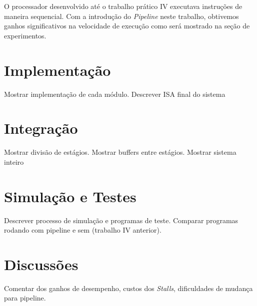 \documentclass[11pt,a4paper,titlepage]{article}
\begin{document}
O processador desenvolvido até o trabalho prático IV executava instruções de maneira
sequencial. Com a introdução do \textit{Pipeline} neste trabalho, obtivemos ganhos
significativos na velocidade de execução como será mostrado na seção de experimentos.

\section{Implementação}

Mostrar implementação de cada módulo. Descrever ISA final do sistema


\section{Integração}

Mostrar divisão de estágios. Mostrar buffers entre estágios. Mostrar sistema inteiro

\section{Simulação e Testes}

Descrever processo de simulação e programas de teste. Comparar programas rodando com pipeline e sem (trabalho IV anterior).


\section{Discussões}

Comentar dos ganhos de desempenho, custos dos \textit{Stalls}, dificuldades de mudança para pipeline.



%

\nocite{*}
\end{document}
